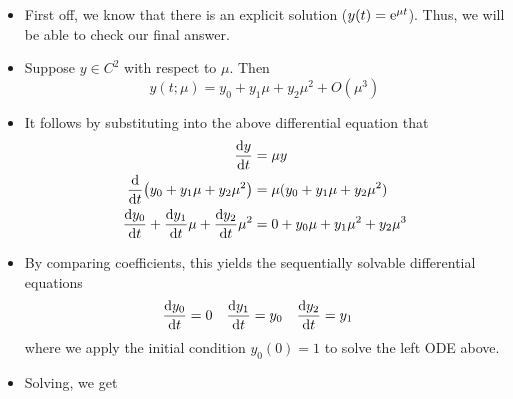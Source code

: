 \documentclass[../notes.tex]{subfiles}
\begin{document}
\begin{itemize}
    \begin{itemize}
        \item First off, we know that there is an explicit solution ($y(t)=\e[\mu t]$). Thus, we will be able to check our final answer.
        \item Suppose $y\in C^2$ with respect to $\mu$. Then
        \begin{equation*}
            y(t;\mu) = y_0+y_1\mu+y_2\mu^2+O(\mu^3)
        \end{equation*}
        \item It follows by substituting into the above differential equation that
        \begin{align*}
            \dv{y}{t} &= \mu y\\
            \dv{t}(y_0+y_1\mu+y_2\mu^2) &= \mu(y_0+y_1\mu+y_2\mu^2)\\
            \dv{y_0}{t}+\dv{y_1}{t}\mu+\dv{y_2}{t}\mu^2 &= 0+y_0\mu+y_1\mu^2+y_2\mu^3
        \end{align*}
        \item By comparing coefficients, this yields the sequentially solvable differential equations
        \begin{align*}
            \dv{y_0}{t} &= 0&
            \dv{y_1}{t} &= y_0&
            \dv{y_2}{t} &= y_1
        \end{align*}
        where we apply the initial condition $y_0(0)=1$ to solve the left ODE above.
        \item Solving, we get
        \begin{align*}

\end{align*}
\end{itemize}
\end{itemize}
\end{document}
